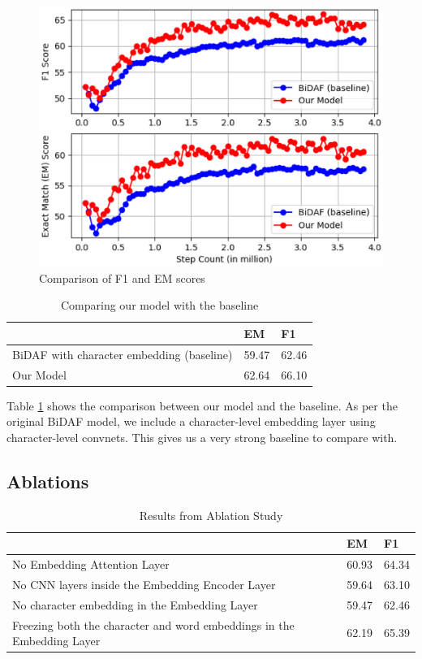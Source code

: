 \begin{figure}[h!]
\centering
	\includegraphics[width=12cm]{Figs4Paper/F1EM.eps}
  \caption{Comparison of F1 and EM scores}
  \label{fig:f1em}
\end{figure}


\begin{table}[]
\caption{Comparing our model with the baseline}
\label{table:results}
\centering
\begin{tabular}{lll}
																									& EM    & F1    \\ \hline
BiDAF with character embedding (baseline)				  & 59.47 & 62.46 \\
Our Model																					& 62.64 & 66.10 \\ \hline

\end{tabular}
\end{table}

Table \ref{table:results} shows the comparison between our model and the baseline. As per the original BiDAF model, we include a character-level embedding layer using character-level convnets. This gives us a very strong baseline to compare with.


\subsection{Ablations}
\label{subsec:ablations}


\begin{table}[]
\caption{Results from Ablation Study}
\label{table:ablation}
\centering
\begin{tabular}{lll}
                                                                       & EM    & F1    \\ \hline
No Embedding Attention Layer                                           & 60.93 & 64.34 \\
No CNN layers inside the Embedding Encoder Layer                       & 59.64 & 63.10 \\
No character embedding in the Embedding Layer                          & 59.47 & 62.46 \\
Freezing both the character and word embeddings in the Embedding Layer & 62.19 & 65.39 \\ \hline

\end{tabular}
\end{table}


